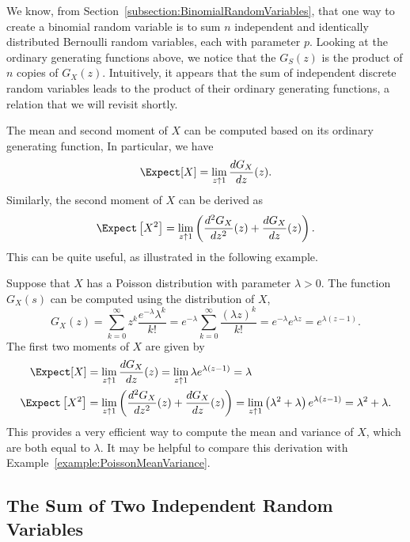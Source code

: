 We know, from Section~\ref{subsection:BinomialRandomVariables}, that one way to create a binomial random variable is to sum $n$ independent and identically distributed Bernoulli random variables, each with parameter $p$.
Looking at the ordinary generating functions above, we notice that the $G_S(z)$ is the product of $n$ copies of $G_X(z)$.
Intuitively, it appears that the sum of independent discrete random variables leads to the product of their ordinary generating functions, a relation that we will revisit shortly.

The mean and second moment of $X$ can be computed based on its ordinary generating function,
In particular, we have
\begin{equation*}
\Expect [X] = \lim_{z \uparrow 1} \frac{d G_X}{dz}(z) .
\end{equation*}
Similarly, the second moment of $X$ can be derived as
\begin{equation*}
\Expect \left[ X^2 \right]
= \lim_{z \uparrow 1} \left( \frac{d^2 G_X}{dz^2}(z) + \frac{d G_X}{dz}(z) \right) .
\end{equation*}
This can be quite useful, as illustrated in the following example.

\begin{example}
Suppose that $X$ has a Poisson distribution with parameter $\lambda > 0$.
The function $G_X(s)$ can be computed using the distribution of $X$,
\begin{equation*}
G_X(z) = \sum_{k = 0}^\infty z^{k} \frac{e^{-\lambda}\lambda^k}{k!}
= e^{-\lambda} \sum_{k = 0}^\infty \frac{(\lambda z)^k}{k!}
= e^{-\lambda} e^{\lambda z} = e^{\lambda(z - 1)} .
\end{equation*}
The first two moments of $X$ are given by
\begin{align*}
\Expect [X] &= \lim_{z \uparrow 1} \frac{d G_X}{dz} (z)
= \lim_{z \uparrow 1} \lambda e^{\lambda(z - 1)} = \lambda \\
\Expect \left[ X^2 \right] &= \lim_{z \uparrow 1}
\left( \frac{d^2 G_X}{dz^2} (z) + \frac{d G_X}{dz} (z) \right)
= \lim_{z \uparrow 1} \left( \lambda^2 + \lambda \right)
e^{\lambda (z - 1)} = \lambda^2 + \lambda .
\end{align*}
This provides a very efficient way to compute the mean and variance of $X$, which are both equal to $\lambda$.
It may be helpful to compare this derivation with Example~\ref{example:PoissonMeanVariance}.
\end{example}

\subsection{The Sum of Two Independent Random Variables}

